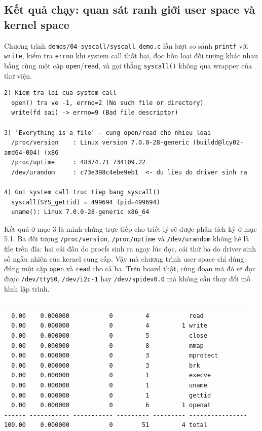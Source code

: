 \documentclass[11pt]{article}
\newcommand{\code}[1]{\texttt{#1}}
\begin{document}
\subsection{Kết quả chạy: quan sát ranh giới user space và kernel space}

Chương trình \code{demos/04-syscall/syscall\_demo.c} lần lượt so sánh \code{printf} với \code{write}, kiểm tra \code{errno} khi system call thất bại, đọc bốn loại đối tượng khác nhau bằng cùng một cặp \code{open}/\code{read}, và gọi thẳng \code{syscall()} không qua wrapper của thư viện.

\begin{lstlisting}[caption={Kiểm tra lỗi system call và mô hình "everything is a file"}]
2) Kiem tra loi cua system call
  open() tra ve -1, errno=2 (No such file or directory)
  write(fd sai) -> errno=9 (Bad file descriptor)

3) 'Everything is a file' - cung open/read cho nhieu loai
  /proc/version    : Linux version 7.0.0-28-generic (buildd@lcy02-amd64-004) (x86
  /proc/uptime     : 48374.71 734109.22
  /dev/urandom     : c73e398c4ebe9eb1  <- du lieu do driver sinh ra

4) Goi system call truc tiep bang syscall()
  syscall(SYS_gettid) = 499694 (pid=499694)
  uname(): Linux 7.0.0-28-generic x86_64
\end{lstlisting}

Kết quả ở mục 3 là minh chứng trực tiếp cho triết lý sẽ được phân tích kỹ ở mục 5.1. Ba đối tượng \code{/proc/version}, \code{/proc/uptime} và \code{/dev/urandom} không hề là file trên đĩa: hai cái đầu do procfs sinh ra ngay lúc đọc, cái thứ ba do driver sinh số ngẫu nhiên của kernel cung cấp. Vậy mà chương trình user space chỉ dùng đúng một cặp \code{open} và \code{read} cho cả ba. Trên board thật, cùng đoạn mã đó sẽ đọc được \code{/dev/ttyS0}, \code{/dev/i2c-1} hay \code{/dev/spidev0.0} mà không cần thay đổi mô hình lập trình.

\begin{lstlisting}[caption={Thống kê system call bằng \code{strace -c}}]
% time     seconds  usecs/call     calls    errors syscall
------ ----------- ----------- --------- --------- ----------------
  0.00    0.000000           0         4           read
  0.00    0.000000           0         4         1 write
  0.00    0.000000           0         5           close
  0.00    0.000000           0         8           mmap
  0.00    0.000000           0         3           mprotect
  0.00    0.000000           0         3           brk
  0.00    0.000000           0         1           execve
  0.00    0.000000           0         1           uname
  0.00    0.000000           0         1           gettid
  0.00    0.000000           0         6         1 openat
------ ----------- ----------- --------- --------- ----------------
100.00    0.000000           0        51         4 total
\end{lstlisting}
\end{document}
